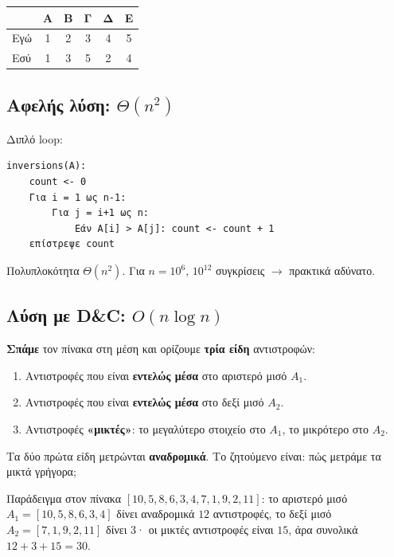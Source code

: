\documentclass[11pt,a4paper]{article}
\begin{document}
\begin{center}
\begin{tabular}{@{}l c c c c c@{}}
\toprule
     & Α & Β & Γ & Δ & Ε \\
\midrule
Εγώ  & 1 & 2 & 3 & 4 & 5 \\
Εσύ  & 1 & 3 & 5 & 2 & 4 \\
\bottomrule
\end{tabular}
\end{center}

\subsection{Αφελής λύση: $\Theta(n^2)$}

Διπλό loop:
\begin{codebox}
\begin{verbatim}
inversions(A):
    count <- 0
    Για i = 1 ως n-1:
        Για j = i+1 ως n:
            Εάν A[i] > A[j]: count <- count + 1
    επίστρεψε count
\end{verbatim}
\end{codebox}
Πολυπλοκότητα $\Theta(n^2)$. Για $n = 10^6$, $10^{12}$ συγκρίσεις $\to$ πρακτικά
αδύνατο.

\subsection{Λύση με D\&C: $O(n \log n)$}

\textbf{Σπάμε} τον πίνακα στη μέση και ορίζουμε \textbf{τρία είδη} αντιστροφών:
\begin{enumerate}
  \item Αντιστροφές που είναι \textbf{εντελώς μέσα} στο αριστερό μισό $A_1$.
  \item Αντιστροφές που είναι \textbf{εντελώς μέσα} στο δεξί μισό $A_2$.
  \item Αντιστροφές \textbf{«μικτές»}: το μεγαλύτερο στοιχείο στο $A_1$, το
  μικρότερο στο $A_2$.
\end{enumerate}
Τα δύο πρώτα είδη μετρώνται \textbf{αναδρομικά}. Το ζητούμενο είναι: πώς μετράμε
τα μικτά γρήγορα;

\begin{notebox}
Παράδειγμα στον πίνακα $[10, 5, 8, 6, 3, 4, 7, 1, 9, 2, 11]$: το αριστερό μισό
$A_1 = [10, 5, 8, 6, 3, 4]$ δίνει αναδρομικά $12$ αντιστροφές, το δεξί μισό
$A_2 = [7, 1, 9, 2, 11]$ δίνει $3$· οι μικτές αντιστροφές είναι $15$, άρα
συνολικά $12 + 3 + 15 = 30$.
\end{notebox}
\end{document}
